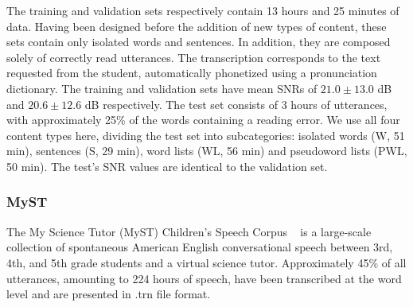 \documentclass{Interspeech2024}
\begin{document}
The training and validation sets respectively contain 13 hours and 25 minutes of data. Having been designed before the addition of new types of content, these sets contain only isolated words and sentences. In addition, they are composed solely of correctly read utterances. The transcription corresponds to the text requested from the student, automatically phonetized using a pronunciation dictionary. The training and validation sets have mean SNRs of $21.0\pm13.0$ dB and $20.6\pm12.6$ dB respectively.
The test set consists of 3 hours of utterances, with approximately 25\% of the words containing a reading error. We use all four content types here, dividing the test set into subcategories: isolated words (W, 51 min), sentences (S, 29 min), word lists (WL, 56 min) and pseudoword lists (PWL, 50 min). The test's SNR values are identical to the validation set.



\subsubsection{MyST}

The My Science Tutor (MyST) Children's Speech Corpus ~\cite{pradhan2023science} is a large-scale collection of spontaneous American English conversational speech between 3rd, 4th, and 5th grade students and a virtual science tutor. 
Approximately 45\% of all utterances, amounting to 224 hours of speech, have been transcribed at the word level and are presented in .trn file format. 

\end{document}

